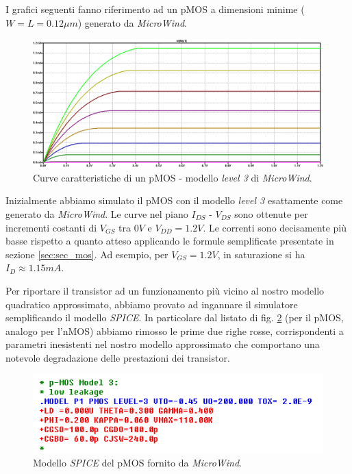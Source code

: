 I grafici seguenti fanno riferimento ad un pMOS a dimensioni minime ($W = L = 0.12 \mu m$) generato da \textit{MicroWind}.

\begin{figure}[hbt!]
	\centering
	\includegraphics[width=1\textwidth]{figure/Sim_DCSweep_PMOS1_ConModelloAccurato(Chiaro).PNG}
	\caption{Curve caratteristiche di un pMOS - modello \textit{level 3} di \textit{MicroWind}.}
	\label{fig:curveCaratteristicheReali}
\end{figure}
Inizialmente abbiamo simulato il pMOS con il modello \textit{level 3} esattamente come generato da \textit{MicroWind}. Le curve nel piano $I_{DS}$ - $V_{DS}$ sono ottenute per incrementi costanti di $V_{GS}$ tra $0V$ e $V_{DD} = 1.2V$. Le correnti sono decisamente più basse rispetto a quanto atteso applicando le formule semplificate presentate in sezione \ref{sec:sec_mos}. Ad esempio, per $V_{GS} = 1.2V$, in saturazione si ha $I_D \approx 1.15mA$.

Per riportare il transistor ad un funzionamento più vicino al nostro modello quadratico approssimato, abbiamo provato ad ingannare il simulatore semplificando il modello \textit{SPICE}. In particolare dal listato di fig. \ref{fig:modelloMOSSpice} (per il pMOS, analogo per l'nMOS) abbiamo rimosso le prime due righe rosse, corrispondenti a parametri inesistenti nel nostro modello approssimato che comportano una notevole degradazione delle prestazioni dei transistor.

\begin{figure}[hbt!]
	\centering
	\includegraphics{figure/Cir_Snapshot_ModelloDelPMOSDiMicrowind.png}
	\caption{Modello \textit{SPICE} del pMOS fornito da \textit{MicroWind}.}
	\label{fig:modelloMOSSpice}
\end{figure}

